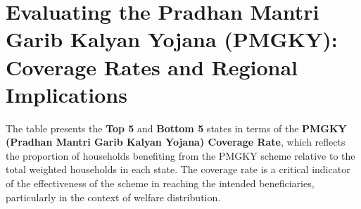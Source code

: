 \documentclass{article}
\begin{document}
\newpage

\section{Evaluating the Pradhan Mantri Garib Kalyan Yojana (PMGKY): Coverage Rates and Regional Implications}

\begin{table}[htbp]
	\centering
	\caption{Top 5 and Bottom 5 PMGKY Coverage Rates by State}
\end{table}



The table presents the \textbf{Top 5} and \textbf{Bottom 5} states in terms of the \textbf{PMGKY (Pradhan Mantri Garib Kalyan Yojana) Coverage Rate}, which reflects the proportion of households benefiting from the PMGKY scheme relative to the total weighted households in each state. The coverage rate is a critical indicator of the effectiveness of the scheme in reaching the intended beneficiaries, particularly in the context of welfare distribution.
\end{document}
